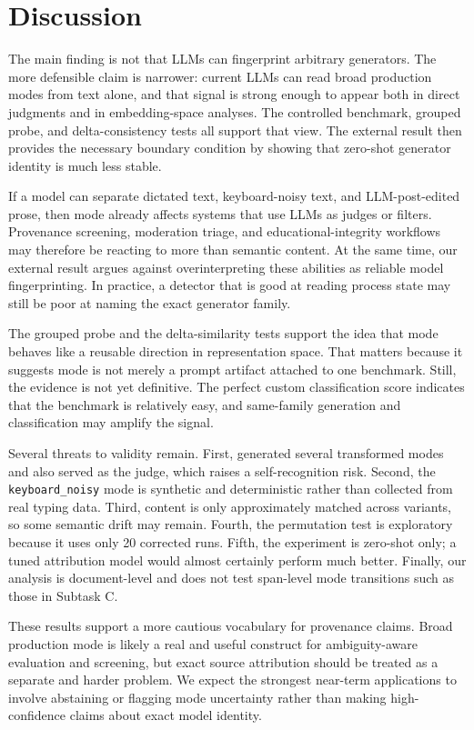 \section{Discussion}
\label{sec:discussion}

 The main finding is not that LLMs can fingerprint arbitrary generators. The more defensible claim is narrower: current LLMs can read broad production modes from text alone, and that signal is strong enough to appear both in direct judgments and in embedding-space analyses. The controlled benchmark, grouped probe, and delta-consistency tests all support that view. The external \semeval result then provides the necessary boundary condition by showing that zero-shot generator identity is much less stable.

 If a model can separate dictated text, keyboard-noisy text, and LLM-post-edited prose, then mode already affects systems that use LLMs as judges or filters. Provenance screening, moderation triage, and educational-integrity workflows may therefore be reacting to more than semantic content. At the same time, our external result argues against overinterpreting these abilities as reliable model fingerprinting. In practice, a detector that is good at reading process state may still be poor at naming the exact generator family.

 The grouped probe and the delta-similarity tests support the idea that mode behaves like a reusable direction in representation space. That matters because it suggests mode is not merely a prompt artifact attached to one benchmark. Still, the evidence is not yet definitive. The perfect custom classification score indicates that the benchmark is relatively easy, and same-family generation and classification may amplify the signal.

 Several threats to validity remain. First, \gptfourone generated several transformed modes and also served as the judge, which raises a self-recognition risk. Second, the \texttt{keyboard\_noisy} mode is synthetic and deterministic rather than collected from real typing data. Third, content is only approximately matched across variants, so some semantic drift may remain. Fourth, the permutation test is exploratory because it uses only 20 corrected runs. Fifth, the \semeval experiment is zero-shot only; a tuned attribution model would almost certainly perform much better. Finally, our analysis is document-level and does not test span-level mode transitions such as those in \semeval Subtask C.

 These results support a more cautious vocabulary for provenance claims. Broad production mode is likely a real and useful construct for ambiguity-aware evaluation and screening, but exact source attribution should be treated as a separate and harder problem. We expect the strongest near-term applications to involve abstaining or flagging mode uncertainty rather than making high-confidence claims about exact model identity.
